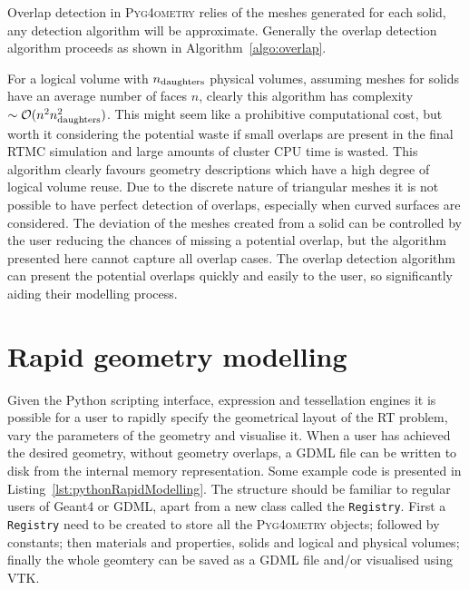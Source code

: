 \documentclass[final,5p,times,twocolumn]{elsarticle}
\newcommand{\pyinline}[1]{\lstinline[postbreak={}]{#1}}
\newcommand{\PYGEOMETRY}{\textsc{Pyg4ometry}}
\begin{document}
Overlap detection in \PYGEOMETRY{} relies of the meshes generated for each solid, 
any detection algorithm will be approximate. Generally the overlap detection 
algorithm proceeds as shown in Algorithm~\ref{algo:overlap}.

For a logical volume with $n_{\rm daughters}$ physical volumes, assuming meshes for solids have an average number of faces $n$, clearly this algorithm 
has complexity $\sim \mathcal{O}(n^2 n_{\rm daughters}^2)$. This might seem like a prohibitive computational cost, but worth it considering the potential 
waste if small overlaps are present in the final RTMC simulation and large amounts of cluster CPU time is wasted. This algorithm clearly favours geometry descriptions which have a high degree of logical volume reuse. Due to the discrete nature of triangular meshes it is not possible to have perfect detection 
of overlaps, especially when curved surfaces are considered. The deviation of the meshes created from a solid can be controlled by the user reducing the 
chances of missing a potential overlap, but the algorithm presented here cannot capture all overlap cases. The overlap detection algorithm can 
present the potential overlaps quickly and easily to the user, so significantly aiding their modelling process. 


\section{Rapid geometry modelling}
Given the Python scripting interface, expression  and tessellation engines it is possible for a user to rapidly specify the geometrical layout of the RT problem, vary 
the parameters of the geometry and visualise it.  When a user has achieved the desired geometry, without geometry overlaps, a GDML file can be written to disk from the internal memory representation. Some example code is presented in Listing~\ref{lst:pythonRapidModelling}. The structure should be familiar to regular 
users of Geant4 or GDML, apart from a new class called the \pyinline{Registry}. First a \verb|Registry| need to be created to store all the \PYGEOMETRY{} objects; followed by constants;  then materials and properties, solids and logical and physical volumes; finally the whole geomtery can be saved as a GDML file and/or visualised using VTK.
\end{document}
